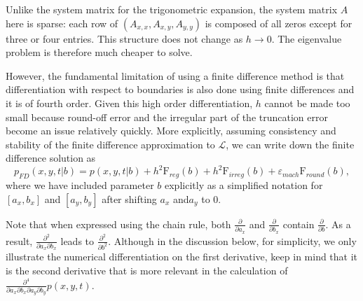 \documentclass[10pt]{article}
\begin{document}
Unlike the system matrix for the trigonometric expansion, the system
matrix $A$ here is sparse: each row of $(A_{x,x}, A_{x,y}, A_{y,y})$
is composed of all zeros except for three or four entries. This
structure does not change as $h \to 0$. The eigenvalue problem is
therefore much cheaper to solve.

However, the fundamental limitation of using a finite difference
method is that differentiation with respect to boundaries is also done
using finite differences and it is of fourth order. Given this high
order differentiation, $h$ cannot be made too small because round-off
error and the irregular part of the truncation error become an issue
relatively quickly. More explicitly, assuming consistency and
stability of the finite difference approximation to $\mathcal{L}$, we
can write down the finite difference solution as
\[
  p_{FD}(\left. x, y, t \right| b) = p(\left. x, y, t \right| b) 
+ h^2 \mbox{F}_{reg}(b) + h^2 \mbox{F}_{irreg}(b) + 
\varepsilon_{mach} \mbox{F}_{round}(b),
\]
where we have included parameter $b $ explicitly as a simplified notation for 
$[a_x, b_x]$ and $[a_y, b_y]$ after shifting $a_x$ and$a_y$ to 0.

Note that when expressed using the chain rule, both 
$\displaystyle \frac{\partial}{\partial a_x}$ and  $\displaystyle \frac{\partial}{\partial b_x}$
contain $\displaystyle \frac{\partial}{\partial b}$. As a result, 
$\displaystyle \frac{\partial^2 }{\partial a_x \partial b_x} $ leads to 
$\displaystyle \frac{\partial^2 }{\partial b^2} $. Although in the discussion below, 
for simplicity, we only illustrate the numerical differentiation on the first derivative, 
keep in mind that it is the second derivative that is more relevant in the calculation of 
 $\displaystyle \frac{\partial^4}{\partial a_x \partial b_x \partial a_y \partial b_y}
p(x, y, t) $. 
\end{document}
